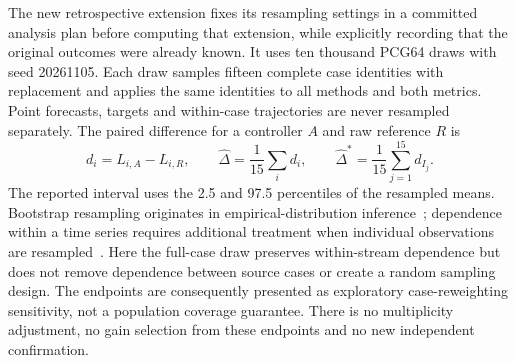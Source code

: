 The new retrospective extension fixes its resampling settings in a committed analysis plan before computing that extension, while explicitly recording that the original outcomes were already known. It uses ten thousand PCG64 draws with seed 20261105. Each draw samples fifteen complete case identities with replacement and applies the same identities to all methods and both metrics. Point forecasts, targets and within-case trajectories are never resampled separately. The paired difference for a controller $A$ and raw reference $R$ is
\begin{equation}\label{eq:case-paired}
 d_i=L_{i,A}-L_{i,R},\qquad
 \widehat\Delta=\frac1{15}\sum_i d_i,\qquad
 \widehat\Delta^*=\frac1{15}\sum_{j=1}^{15}d_{I_j}.
\end{equation}
The reported interval uses the 2.5 and 97.5 percentiles of the resampled means. Bootstrap resampling originates in empirical-distribution inference~\cite{efron1979}; dependence within a time series requires additional treatment when individual observations are resampled~\cite{kunsch1989}. Here the full-case draw preserves within-stream dependence but does not remove dependence between source cases or create a random sampling design. The endpoints are consequently presented as exploratory case-reweighting sensitivity, not a population coverage guarantee. There is no multiplicity adjustment, no gain selection from these endpoints and no new independent confirmation.
